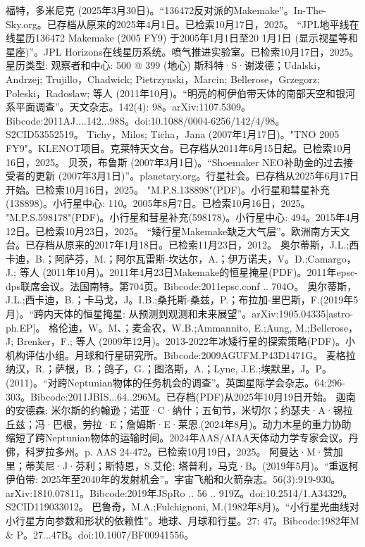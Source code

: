 \begin{enumerate}
 福特，多米尼克 (2025年3月30日)。“136472反对派的Makemake”。In-The-Sky.org。已存档从原来的2025年4月1日。已检索10月17日，2025。
 “JPL地平线在线星历136472 Makemake (2005 FY9) 于2005年1月1日至20 1月1日 (显示视星等和星座)”。JPL Horizons在线星历系统。喷气推进实验室。已检索10月17日，2025。星历类型: 观察者和中心: 500 @ 399 (地心)
 斯科特·S·谢泼德；Udalski，Andrzej; Trujillo，Chadwick; Pietrzynski，Marcin; Bellerose，Grzegorz; Poleski，Radoslaw; 等人 (2011年10月)。“明亮的柯伊伯带天体的南部天空和银河系平面调查”。天文杂志。142(4): 98。arXiv:1107.5309。Bibcode:2011AJ....142...98S。doi:10.1088/0004-6256/142/4/98。S2CID53552519。 
 Tichy，Milos; Ticha，Jana (2007年1月17日)。"TNO 2005 FY9"。KLENOT项目。克莱特天文台。已存档从2011年6月15日起。已检索10月16日，2025。
 贝茨，布鲁斯 (2007年3月1日)。“Shoemaker NEO补助金的过去接受者的更新 (2007年3月1日)”。planetary.org。行星社会。已存档从2025年6月17日开始。已检索10月16日，2025。
 "M.P.S.138898"(PDF)。小行星和彗星补充(138898)。小行星中心: 110。2005年8月7日。已检索10月16日，2025。
 "M.P.S.598178"(PDF)。小行星和彗星补充(598178)。小行星中心: 494。2015年4月12日。已检索10月23日，2025。
 “矮行星Makemake缺乏大气层”。欧洲南方天文台。已存档从原来的2017年1月18日。已检索11月23日，2012。
 奥尔蒂斯，J.L.;西卡迪，B.；阿萨芬，M.；阿尔瓦雷斯-坎达尔，A.；伊万诺夫，V。D.;Camargo，J.; 等人 (2011年10月)。2011年4月23日Makemake的恒星掩星(PDF)。2011年epsc-dps联席会议。法国南特。第704页。Bibcode:2011epsc.conf .. 704O。
 奥尔蒂斯，J.L.;西卡迪，B.；卡马戈，J。I.B.;桑托斯-桑兹，P.；布拉加-里巴斯，F.(2019年5月)。“跨内天体的恒星掩星: 从预测到观测和未来展望”。arXiv:1905.04335[astro-ph.EP]。
 格伦迪，W。M、；麦金农，W.B.;Ammannito, E.;Aung, M.;Bellerose，J; Brenker，F.; 等人 (2009年12月)。2013-2022年冰矮行星的探索策略(PDF)。小机构评估小组。月球和行星研究所。Bibcode:2009AGUFM.P43D1471G。
 麦格拉纳汉，R.；萨根，B.；鸽子，G.；图洛斯，A.；Lyne, J.E.;埃默里，J。P。(2011)。“对跨Neptunian物体的任务机会的调查”。英国星际学会杂志。64:296-303。Bibcode:2011JBIS...64..296M。已存档(PDF)从2025年10月19日开始。
 迦南的安德森; 米尔斯的约翰逊；诺亚·C·纳什；五旬节，米切尔；约瑟夫·A·锡拉丘兹；冯·巴根，劳拉·E；詹姆斯·E·莱恩.(2024年8月)。动力木星的重力协助缩短了跨Neptunian物体的运输时间。2024年AAS/AIAA天体动力学专家会议。丹佛，科罗拉多州。p. AAS 24-472。已检索10月19日，2025。
 阿曼达·M·赞加里；蒂芙尼·J·芬利；斯特恩，S.艾伦; 塔普利，马克·B。(2019年5月)。“重返柯伊伯带: 2025年至2040年的发射机会”。宇宙飞船和火箭杂志。56(3):919-930。arXiv:1810.07811。Bibcode:2019年JSpRo .. 56 .. 919Z。doi:10.2514/1.A34329。S2CID119033012。 
 巴鲁奇，M.A.;Fulchignoni, M.(1982年8月)。“小行星光曲线对小行星方向参数和形状的依赖性”。地球、月球和行星。27: 47。Bibcode:1982年M & P。27...47B。doi:10.1007/BF00941556。
 \end{enumerate}